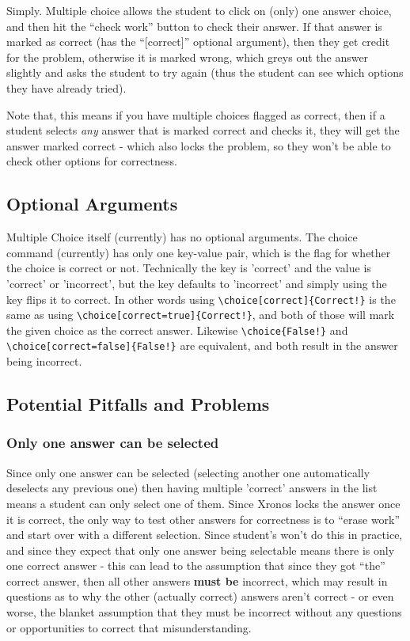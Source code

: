 \documentclass{ximera}
\begin{document}
        Simply. Multiple choice allows the student to click on (only) one answer choice, and then hit the ``check work'' button to check their answer. If that answer is marked as correct (has the ``[correct]'' optional argument), then they get credit for the problem, otherwise it is marked wrong, which greys out the answer slightly and asks the student to try again (thus the student can see which options they have already tried).
        
        Note that, this means if you have multiple choices flagged as correct, then if a student selects \textit{any} answer that is marked correct and checks it, they will get the answer marked correct - which also locks the problem, so they won't be able to check other options for correctness.
        
        

\subsection*{Optional Arguments}

    Multiple Choice itself (currently) has no optional arguments. The choice command (currently) has only one key-value pair, which is the flag for whether the choice is correct or not. Technically the key is 'correct' and the value is 'correct' or 'incorrect', but the key defaults to 'incorrect' and simply using the key flips it to correct. In other words using \verb|\choice[correct]{Correct!}| is the same as using \verb|\choice[correct=true]{Correct!}|, and both of those will mark the given choice as the correct answer. Likewise \verb|\choice{False!}| and \verb|\choice[correct=false]{False!}| are equivalent, and both result in the answer being incorrect.
    

\subsection*{Potential Pitfalls and Problems}
    
    \subsubsection*{Only one answer can be selected}
        Since only one answer can be selected (selecting another one automatically deselects any previous one) then having multiple 'correct' answers in the list means a student can only select one of them. Since Xronos locks the answer once it is correct, the only way to test other answers for correctness is to ``erase work'' and start over with a different selection. Since student's won't do this in practice, and since they expect that only one answer being selectable means there is only one correct answer - this can lead to the assumption that since they got ``the'' correct answer, then all other answers \textbf{must be} incorrect, which may result in questions as to why the other (actually correct) answers aren't correct - or even worse, the blanket assumption that they must be incorrect without any questions or opportunities to correct that misunderstanding.
        
\end{document}
